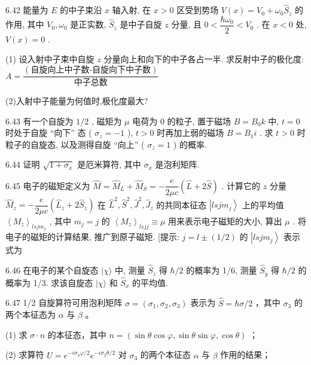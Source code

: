 \vfill\newpage

6.42 能量为 $E$ 的中子束沿 $x$ 轴入射, 在 $x > 0$ 区受到势场 $V(x) = V_0 + \omega_0\hat{S}_z$ 的作用, 其中 $V_0, \omega_0$ 是正实数, $\hat{S}_z$ 是中子自旋 $z$ 分量, 且 $0 < \dfrac{\hbar \omega_0}{2} < V_0$ . 在 $x < 0$ 处, $V(x) = 0$ . 

(1) 设入射中子束中自旋 $z$ 分量向上和向下的中子各占一半. 求反射中子的极化度:$A=\dfrac{(\text{自旋向上中子数-自旋向下中子数})}{\text{中子总数}}$

(2)入射中子能量为何值时,极化度最大?

\vfill\newpage

6.43 有一个自旋为 $1/2$ , 磁矩为 $\mu$ 电荷为 0 的粒子, 置于磁场 $B = B_0 k$ 中, $t = 0$ 时处于自旋 “向下” 态 ( $\sigma_z = -1$ ), $t > 0$ 时再加上弱的磁场 $B = B_1 i$ . 求 $t > 0$ 时粒子的自旋态, 以及测得自旋 “向上” ( $\sigma_z = 1$ ) 的概率.

\vfill\newpage

6.44 证明 $\sqrt{1 + \sigma_x}$ 是厄米算符, 其中 $\sigma_x$ 是泡利矩阵.

\vfill\newpage

6.45 电子的磁矩定义为 $\hat{M} = \hat{M}_L + \hat{M}_S = -\dfrac{e}{2\mu c}\left(\hat{L} + 2\hat{S}\right)$ . 计算它的 $z$ 分量 $\hat{M}_z = -\dfrac{e}{2\mu c}\left(\hat{L}_z + 2\hat{S}_z\right)$ 在 $\hat{L}^2, \hat{S}^2, \hat{J}^2, \hat{J}_z$ 的共同本征态 $\left|lsjm_j\right\rangle$ 上的平均值 $\left\langle M_z\right\rangle_{lsjm_j}$ , 其中 $m_j = j$ 的 $\left\langle M_z\right\rangle_{lsjj} \equiv \mu$ 用来表示电子磁矩的大小, 算出 $\mu$ . 将电子的磁矩的计算结果, 推广到原子磁矩. [提示: $j = l \pm (1/2)$ 的 $\left|lsjm_j\right\rangle$ 表示式为

\vfill\newpage

6.46 在电子的某个自旋态 $|\chi\rangle$ 中, 测量 $\hat{S}_z$ 得 $\hbar / 2$ 的概率为 1/6, 测量 $\hat{S}_y$ 得 $\hbar / 2$ 的概率为 1/3. 求该自旋态 $|\chi\rangle$ 和 $\hat{S}_x$ 的平均值.

\vfill\newpage

6.47 1/2 自旋算符可用泡利矩阵 $\sigma = (\sigma_1, \sigma_2, \sigma_3)$ 表示为 $\hat{S} = \hbar \sigma / 2$ ，其中 $\sigma_3$ 的两个本征态为 $\alpha$ 与 $\beta$ 。

(1) 求 $\sigma \cdot n$ 的本征态，其中 $n = (\sin \theta \cos \varphi, \sin \theta \sin \varphi, \cos \theta)$ ；

(2) 求算符 $\hat{U} = e^{-i\sigma_3\varphi / 2} e^{-i\sigma_2\theta / 2}$ 对 $\sigma_3$ 的两个本征态 $\alpha$ 与 $\beta$ 作用的结果；

